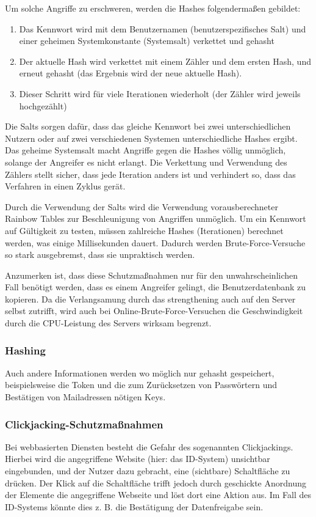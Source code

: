 \documentclass[parskip=half]{scrartcl}
\begin{document}
Um solche Angriffe zu erschweren, werden die Hashes folgendermaßen gebildet:
\begin{enumerate}
	\item Das Kennwort wird mit dem Benutzernamen (benutzerspezifisches Salt) und einer geheimen Systemkonstante (Systemsalt) verkettet und gehasht
	\item Der aktuelle Hash wird verkettet mit einem Zähler und dem ersten Hash, und erneut gehasht (das Ergebnis wird der neue aktuelle Hash).
	\item Dieser Schritt wird für viele Iterationen wiederholt (der Zähler wird jeweils hochgezählt)
\end{enumerate}

Die Salts sorgen dafür, dass das gleiche Kennwort bei zwei unterschiedlichen Nutzern oder auf zwei verschiedenen Systemen unterschiedliche Hashes ergibt.
Das geheime Systemsalt macht Angriffe gegen die Hashes völlig unmöglich, solange der Angreifer es nicht erlangt.
Die Verkettung und Verwendung des Zählers stellt sicher, dass jede Iteration anders ist und verhindert so, dass das Verfahren in einen Zyklus gerät.

Durch die Verwendung der Salts wird die Verwendung vorausberechneter Rainbow Tables zur Beschleunigung von Angriffen unmöglich.
Um ein Kennwort auf Gültigkeit zu testen, müssen zahlreiche Hashes (Iterationen) berechnet werden, was einige Millisekunden dauert.
Dadurch werden Brute-Force-Versuche so stark ausgebremst, dass sie unpraktisch werden.

Anzumerken ist, dass diese Schutzmaßnahmen nur für den unwahrscheinlichen Fall benötigt werden, dass es einem Angreifer gelingt, die Benutzerdatenbank zu kopieren.
Da die Verlangsamung durch das strengthening auch auf den Server selbst zutrifft,
wird auch bei Online-Brute-Force-Versuchen die Geschwindigkeit durch die CPU-Leistung des Servers wirksam begrenzt.

\subsubsection{Hashing}
Auch andere Informationen werden wo möglich nur gehasht gespeichert,
beispielsweise die Token und die zum Zurücksetzen von Passwörtern und Bestätigen von Mailadressen nötigen Keys.

\subsubsection{Clickjacking-Schutzmaßnahmen}
Bei webbasierten Diensten besteht die Gefahr des sogenannten Clickjackings.
Hierbei wird die angegriffene Website (hier: das ID-System) unsichtbar eingebunden, und der Nutzer dazu gebracht, eine (sichtbare) Schaltfläche zu drücken.
Der Klick auf die Schaltfläche trifft jedoch durch geschickte Anordnung der Elemente die angegriffene Webseite und löst dort eine Aktion aus.
Im Fall des ID-Systems könnte dies z. B. die Bestätigung der Datenfreigabe sein.
\end{document}
